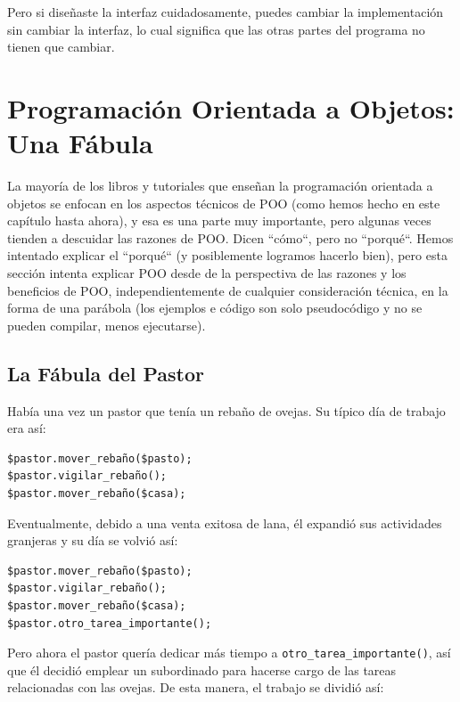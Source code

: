 Pero si diseñaste la interfaz cuidadosamente, puedes cambiar
la implementación sin cambiar la interfaz, lo cual significa que las
otras partes del programa no tienen que cambiar.

\section{Programación Orientada a Objetos: Una Fábula}

La mayoría de los libros y tutoriales que enseñan 
la programación orientada a objetos se enfocan en los
aspectos técnicos de POO (como hemos hecho en este capítulo
hasta ahora), y esa es una parte muy importante, pero algunas
veces tienden a descuidar las razones de POO. Dicen 
``cómo``, pero no ``porqué``. Hemos intentado explicar
el ``porqué`` (y posiblemente logramos hacerlo bien), pero
esta sección intenta explicar POO desde de la perspectiva de las
razones y los beneficios de POO, independientemente de 
cualquier consideración técnica, en la forma de una parábola (los ejemplos
e código son solo pseudocódigo y no se pueden compilar, menos
ejecutarse).

\subsection{La Fábula del Pastor} 

Había una vez un pastor que tenía un rebaño de ovejas. 
Su típico día de trabajo era así:

\begin{lstlisting}
$pastor.mover_rebaño($pasto);
$pastor.vigilar_rebaño();
$pastor.mover_rebaño($casa);
\end{lstlisting}

Eventualmente, debido a una venta exitosa de lana, él
expandió sus actividades granjeras y su día se volvió
así:

\begin{lstlisting}
$pastor.mover_rebaño($pasto);
$pastor.vigilar_rebaño();
$pastor.mover_rebaño($casa);
$pastor.otro_tarea_importante();
\end{lstlisting}

Pero ahora el pastor quería dedicar más tiempo a 
\verb|otro_tarea_importante()|, así que él decidió 
emplear un subordinado para hacerse cargo de las tareas
relacionadas con las ovejas. De esta manera, el trabajo
se dividió así:

